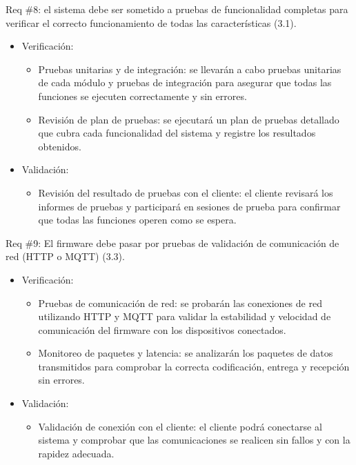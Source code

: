 \documentclass[
11pt, %
]{charter}
\begin{document}
\begin{itemize}
Req \#8: el sistema debe ser sometido a pruebas de funcionalidad completas para verificar el correcto funcionamiento de todas las características (3.1).
\begin{itemize}
    \item Verificación:
    \begin{itemize}
        \item Pruebas unitarias y de integración: se llevarán a cabo pruebas unitarias de cada módulo y pruebas de integración para asegurar que todas las funciones se ejecuten correctamente y sin errores.
        \item Revisión de plan de pruebas: se ejecutará un plan de pruebas detallado que cubra cada funcionalidad del sistema y registre los resultados obtenidos.
    \end{itemize}
    \item Validación:
    \begin{itemize}
        \item Revisión del resultado de pruebas con el cliente: el cliente revisará los informes de pruebas y participará en sesiones de prueba para confirmar que todas las funciones operen como se espera.
    \end{itemize}
\end{itemize}

Req \#9: El firmware debe pasar por pruebas de validación de comunicación de red (HTTP o MQTT) (3.3).
\begin{itemize}
    \item Verificación:
    \begin{itemize}
        \item Pruebas de comunicación de red: se probarán las conexiones de red utilizando HTTP y MQTT para validar la estabilidad y velocidad de comunicación del firmware con los dispositivos conectados.
        \item Monitoreo de paquetes y latencia: se analizarán los paquetes de datos transmitidos para comprobar la correcta codificación, entrega y recepción sin errores.
    \end{itemize}
    \item Validación:
    \begin{itemize}
        \item Validación de conexión con el cliente: el cliente podrá conectarse al sistema y comprobar que las comunicaciones se realicen sin fallos y con la rapidez adecuada.
    \end{itemize}
\end{itemize}


\end{itemize}
\end{document}
